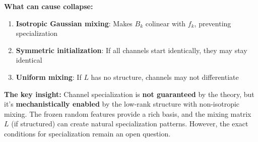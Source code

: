\textbf{What can cause collapse:}
\begin{enumerate}
\item \textbf{Isotropic Gaussian mixing}: Makes $B_k$ colinear with $f_k$, preventing specialization
\item \textbf{Symmetric initialization}: If all channels start identically, they may stay identical
\item \textbf{Uniform mixing}: If $L$ has no structure, channels may not differentiate
\end{enumerate}

\textbf{The key insight:} Channel specialization is \textbf{not guaranteed} by the theory, but it's \textbf{mechanistically enabled} by the low-rank structure with non-isotropic mixing. The frozen random features provide a rich basis, and the mixing matrix $L$ (if structured) can create natural specialization patterns. However, the exact conditions for specialization remain an open question.

